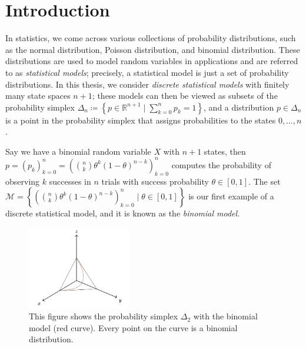 \chapter{Introduction} 

In statistics, we come across various collections of probability distributions, such as the normal distribution, Poisson distribution, and binomial distribution. These distributions are used to model random variables in applications and are referred to as \emph{statistical models}; precisely, a statistical model is just a set of probability distributions. In this thesis, we consider \emph{discrete statistical models} with finitely many state spaces \( n + 1 \); these models can then be viewed as subsets of the probability simplex \( \Delta_n \coloneqq \left\{ p \in \mathbb{R}^{n + 1} \mid \sum_{k=0}^n p_k = 1 \right\} \), and a distribution \( p \in \Delta_n \) is a point in the probability simplex that assigns probabilities to the states \( 0, \dots, n \).
 
\begin{example}
Say we have a binomial random variable \( X \) with \( n + 1 \) states, then \( p = (p_k)_{k=0}^n = (\binom{n}{k} \theta^k (1-\theta)^{n-k})_{k=0}^n \) computes the probability of observing \( k \) successes in \( n \) trials with success probability \( \theta \in [0,1] \). The set \( \mathcal{M} = \left\{ (\binom{n}{k} \theta^k (1-\theta)^{n-k})_{k=0}^n \mid \theta \in [0,1] \right\} \) is our first example of a discrete statistical model, and it is known as the \emph{binomial model}.

\begin{figure}[H]
    \centering
    \includegraphics[width=0.4\textwidth]{assets/binom-discrete-model.png}
    \caption{This figure shows the probability simplex \( \Delta_2 \) with the binomial model (red curve). Every point on the curve is a binomial distribution.}
    \label{fig:binom-discrete-model}
\end{figure}
\end{example}


